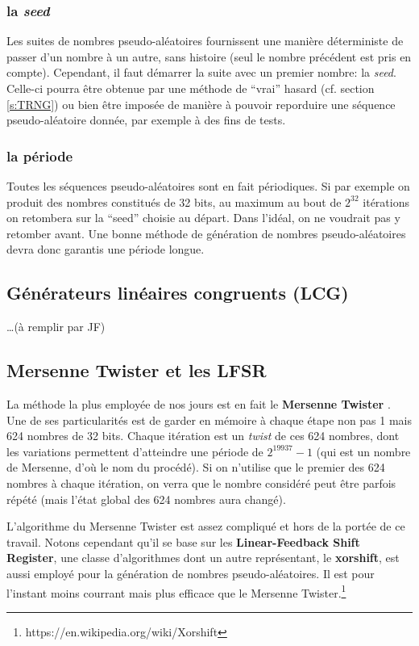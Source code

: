 \documentclass{scrartcl}
\begin{document}
\subsubsection{la \textit{seed}}
Les suites de nombres pseudo-aléatoires fournissent une manière déterministe de
passer d'un nombre à un autre, sans histoire (seul le nombre précédent est pris
en compte). Cependant, il faut démarrer la suite avec un premier nombre: la
\textit{seed}. Celle-ci pourra être obtenue par une méthode de ``vrai'' hasard
(cf. section \ref{s:TRNG}) ou bien être imposée de manière à pouvoir reporduire
une séquence pseudo-aléatoire donnée, par exemple à des fins de tests.
\subsubsection{la période}
Toutes les séquences pseudo-aléatoires sont en fait périodiques. Si par exemple
on produit des nombres constitués de 32 bits, au maximum au bout de $2^{32}$
itérations on retombera sur la ``seed'' choisie au départ. Dans l'idéal, on ne
voudrait pas y retomber avant. Une bonne méthode de génération de nombres
pseudo-aléatoires devra donc garantis une période longue.

\subsection{Générateurs linéaires congruents (LCG)}
\ldots (à remplir par JF)

\subsection{Mersenne Twister et les LFSR}\label{s:MT}
La méthode la plus employée de nos jours est en fait le \textbf{Mersenne
  Twister} \cite{MT}. Une de ses particularités est de garder en mémoire à
chaque étape non pas 1 mais 624 nombres de 32 bits. Chaque itération est un
\textit{twist} de ces 624 nombres, dont les variations permettent d'atteindre
une période de $2^{19937}-1$ (qui est un nombre de Mersenne, d'où le nom du
procédé). Si on n'utilise que le premier des 624 nombres à chaque itération, on
verra que le nombre considéré peut être parfois répété (mais l'état global des
624 nombres aura changé).

L'algorithme du Mersenne Twister est assez compliqué et hors de la portée de ce
travail. Notons cependant qu'il se base sur les  \textbf{Linear-Feedback Shift
  Register}, une classe d'algorithmes dont un autre représentant, le
\textbf{xorshift}, est aussi employé pour la génération de nombres
pseudo-aléatoires. Il est pour l'instant moins courrant mais plus efficace que
le Mersenne Twister.\footnote{https://en.wikipedia.org/wiki/Xorshift}
\end{document}
